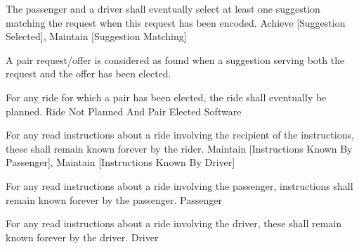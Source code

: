  \startkaosspec
  	 {The passenger and a driver shall eventually select at least one suggestion matching the request when this request has been encoded.}
  	 {Achieve [Suggestion Selected], Maintain [Suggestion Matching]}
  \stopkaosspec

  \startkaosspec
  	 {A pair request/offer is considered as found when a suggestion serving both the request and the offer has been elected.}
  \stopkaosspec

  \startkaosspec
  	 {For any ride for which a pair has been elected, the ride shall eventually be planned.}
  	 {Ride Not Planned And Pair Elected}
  	 {Software}
  \stopkaosspec


    {}

  \startkaosspec
  	 {For any read instructions about a ride involving the recipient of the instructions, these shall remain known forever by the rider.}
  	 {Maintain [Instructions Known By Passenger], Maintain [Instructions Known By Driver]}
  \stopkaosspec

  \startkaosspec
  	 {For any read instructions about a ride involving the passenger, instructions shall remain known forever by the passenger.}
  	 {Passenger}
  \stopkaosspec

  \startkaosspec
  	 {For any read instructions about a ride involving the driver, these shall remain known forever by the driver.}
  	 {Driver}
  \stopkaosspec


    {}

